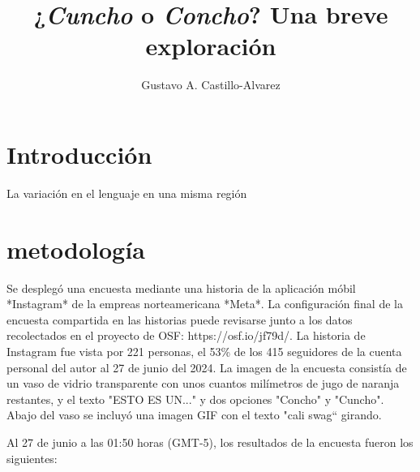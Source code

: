 \documentclass[letter, twocolumn]{article}
\title{¿\textit{Cuncho} o \textit{Concho}? Una breve exploración}
\author{Gustavo A. Castillo-Alvarez}
\begin{document}
\maketitle

\section{Introducción}
La variación en el lenguaje en una misma región 

\section{metodología}
Se desplegó una encuesta mediante una historia de la aplicación móbil *Instagram* de la empreas norteamericana *Meta*. La configuración final de la encuesta compartida en las historias puede revisarse junto a los datos recolectados en el proyecto de OSF: https://osf.io/jf79d/. La historia de Instagram fue vista por 221 personas, el 53\% de los 415 seguidores de la cuenta personal del autor al 27 de junio del 2024. La imagen de la encuesta consistía de un vaso de vidrio transparente con unos cuantos milímetros de jugo de naranja restantes, y el texto "ESTO ES UN..." y dos opciones "Concho" y "Cuncho". Abajo del vaso se incluyó una imagen GIF con el texto "cali swag`` girando. 

Al 27 de junio a las 01:50 horas (GMT-5), los resultados de la encuesta fueron los siguientes:


\end{document}
